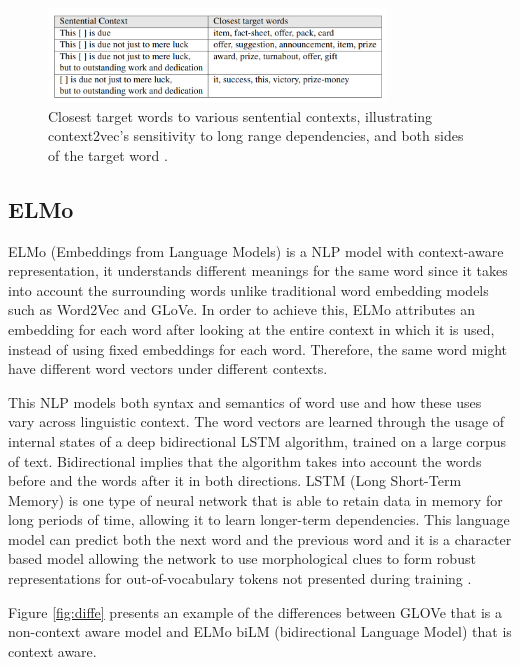             \begin{figure}[H]
                \centering
                \captionsetup{justification=centering}
                \includegraphics[width=0.8\textwidth]{Sections/3StateOfTheArt/3_images/context2vec_predict.png}
                \caption[Context2vec's closest target words]{Closest target words to various sentential contexts, illustrating context2vec’s sensitivity to long range dependencies, and both sides of the target word \cite{Melamud2016}.} 
            \end{figure}
            
        

        \subsection{ELMo}

            \par ELMo (Embeddings from Language Models) is a NLP model with context-aware representation, it understands different meanings for the same word since it takes into account the surrounding words unlike traditional word embedding models such as Word2Vec and GLoVe. In order to achieve this, ELMo attributes an embedding for each word after looking at the entire context in which it is used, instead of using fixed embeddings for each word. Therefore, the same word might have different word vectors under different contexts.
            \par This NLP models both syntax and semantics of word use and how these uses vary across linguistic context. The word vectors are learned through the usage of internal states of a deep bidirectional LSTM algorithm, trained on a large corpus of text. Bidirectional implies that the algorithm takes into account the words before and the words after it in both directions. LSTM (Long Short-Term Memory) is one type of neural network that is able to retain data in memory for long periods of time, allowing it to learn longer-term dependencies.
            This language model can predict both the next word and the previous word and it is a character based model allowing the network to use morphological clues to form robust representations for out-of-vocabulary tokens not presented during training \cite{Peters:2018}.
            \par Figure \ref{fig:diffe} presents an example of the differences between GLOVe that is a non-context aware model and ELMo biLM (bidirectional Language Model) that is context aware.

